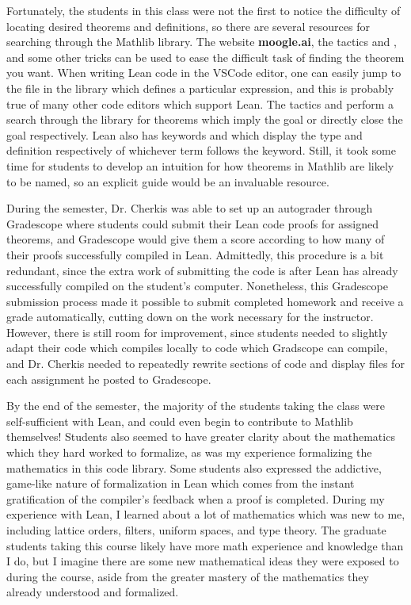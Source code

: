 Fortunately, the students in this class were not the first to notice the 
difficulty of locating desired theorems and definitions, 
so there are several resources for searching through the Mathlib library. 
The website \textbf{moogle.ai}, the tactics  and , 
and some other tricks can be used to ease the difficult task of finding the 
theorem you want. When writing Lean code in the VSCode editor, one can 
easily jump to the file in the library which defines a particular expression,
and this is probably true of many other code editors which support Lean. The 
tactics  and  perform a search through the library
for theorems which imply the goal or directly close the goal respectively. 
Lean also has keywords  and  which display
the type and definition respectively of whichever term follows the keyword.
Still, it took some time for students to develop an intuition for how
theorems in Mathlib are likely to be named, so an explicit guide would 
be an invaluable resource. 

During the semester, Dr. Cherkis was able to set up an autograder 
through Gradescope where students could submit their Lean code proofs
for assigned theorems, and Gradescope would give them a score according to 
how many of their proofs successfully compiled in Lean. Admittedly, this 
procedure is a bit redundant, since the extra work of submitting the code
is after Lean has already successfully compiled on the student's computer.
Nonetheless, this Gradescope submission process made it possible to 
submit completed homework and receive a grade automatically, cutting down on
the work necessary for the instructor. However, there is still room for
improvement, since students needed to slightly adapt their code which compiles
locally to code which Gradscope can compile, and Dr. Cherkis needed to 
repeatedly rewrite sections of code and display files for each assignment he 
posted to Gradescope. 

By the end of the semester, the majority of the students taking the
class were self-sufficient with Lean, and could even begin to contribute
to Mathlib themselves! Students also seemed to have greater clarity 
about the mathematics which they hard worked to formalize, as was my 
experience formalizing the mathematics in this code library. 
Some students also expressed the addictive, game-like nature of formalization
in Lean which comes from the instant gratification of the compiler's feedback
when a proof is completed. During my experience with Lean, I learned about a 
lot of mathematics which was new to me, including lattice orders, filters, 
uniform spaces, and type theory. The graduate students taking this course
likely have more math experience and knowledge than I do, but I imagine 
there are some new mathematical ideas they were exposed to during the course,
aside from the greater mastery of the mathematics they already understood and
formalized.

